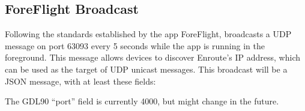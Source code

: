 \documentclass[letterpaper,10pt,english]{sphinxmanual}
\begin{document}
\subsection{ForeFlight Broadcast}
\label{\detokenize{04-appendix/technical:foreflight-broadcast}}
\sphinxAtStartPar
Following the standards established by the app ForeFlight,  broadcasts a UDP message on port 63093 every 5 seconds while the
app is running in the foreground.  This message allows devices to discover
Enroute’s IP address, which can be used as the target of UDP unicast messages.
This broadcast will be a JSON message, with at least these fields:

\begin{sphinxVerbatim}[commandchars=\\\{\}]
\end{sphinxVerbatim}

\sphinxAtStartPar
The GDL90 “port” field is currently 4000, but might change in the future.



\renewcommand{\indexname}{Index}
\footnotesize\raggedright\printindex
\end{document}
